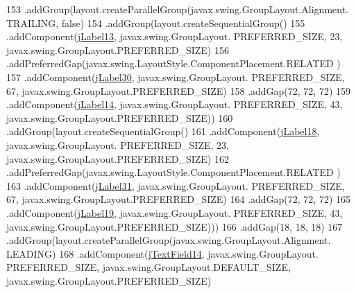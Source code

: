 \begin{DoxyCode}
153                                 .addGroup(layout.createParallelGroup(javax.swing.GroupLayout.Alignment.
      TRAILING, \textcolor{keyword}{false})
154                                     .addGroup(layout.createSequentialGroup()
155                                         .addComponent(\mbox{\hyperlink{classinterfacessoguar_1_1paenrique_a4b950a5b2a126d8b9d9bcb1578605f13}{jLabel13}}, javax.swing.GroupLayout.
      PREFERRED\_SIZE, 23, javax.swing.GroupLayout.PREFERRED\_SIZE)
156                                         .addPreferredGap(javax.swing.LayoutStyle.ComponentPlacement.RELATED
      )
157                                         .addComponent(\mbox{\hyperlink{classinterfacessoguar_1_1paenrique_a592d4e690f30eaa5c1c7626271d513f2}{jLabel30}}, javax.swing.GroupLayout.
      PREFERRED\_SIZE, 67, javax.swing.GroupLayout.PREFERRED\_SIZE)
158                                         .addGap(72, 72, 72)
159                                         .addComponent(\mbox{\hyperlink{classinterfacessoguar_1_1paenrique_a3155f4aea6f0a87b75cb71152763fe4a}{jLabel14}}, javax.swing.GroupLayout.
      PREFERRED\_SIZE, 43, javax.swing.GroupLayout.PREFERRED\_SIZE))
160                                     .addGroup(layout.createSequentialGroup()
161                                         .addComponent(\mbox{\hyperlink{classinterfacessoguar_1_1paenrique_a81a2ccdeb485bf8ec4bdc5f952b83e21}{jLabel18}}, javax.swing.GroupLayout.
      PREFERRED\_SIZE, 23, javax.swing.GroupLayout.PREFERRED\_SIZE)
162                                         .addPreferredGap(javax.swing.LayoutStyle.ComponentPlacement.RELATED
      )
163                                         .addComponent(\mbox{\hyperlink{classinterfacessoguar_1_1paenrique_a9a9d32bd5f42fadfd293170415a4ebae}{jLabel31}}, javax.swing.GroupLayout.
      PREFERRED\_SIZE, 67, javax.swing.GroupLayout.PREFERRED\_SIZE)
164                                         .addGap(72, 72, 72)
165                                         .addComponent(\mbox{\hyperlink{classinterfacessoguar_1_1paenrique_ab4f7d75f1e894ee3d7f89612ca7f300c}{jLabel19}}, javax.swing.GroupLayout.
      PREFERRED\_SIZE, 43, javax.swing.GroupLayout.PREFERRED\_SIZE)))
166                                 .addGap(18, 18, 18)
167                                 .addGroup(layout.createParallelGroup(javax.swing.GroupLayout.Alignment.
      LEADING)
168                                     .addComponent(\mbox{\hyperlink{classinterfacessoguar_1_1paenrique_aa8f99e5eec16f87bcbd493e159554332}{jTextField14}}, javax.swing.GroupLayout.
      PREFERRED\_SIZE, javax.swing.GroupLayout.DEFAULT\_SIZE, javax.swing.GroupLayout.PREFERRED\_SIZE)

\end{DoxyCode}
